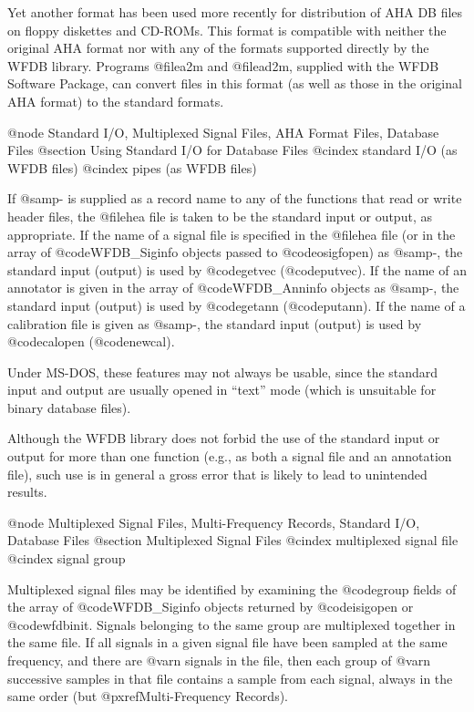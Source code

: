 {{{{{{{{{{Yet another format has been used more recently for distribution of AHA DB files
on floppy diskettes and CD-ROMs.  This format is compatible with neither the
original AHA format nor with any of the formats supported directly by the WFDB
library.  Programs @file{a2m} and @file{ad2m}, supplied with the WFDB Software
Package, can convert files in this format (as well as those in the original AHA
format) to the standard formats.

@node Standard I/O, Multiplexed Signal Files, AHA Format Files, Database Files
@section Using Standard I/O for Database Files
@cindex standard I/O (as WFDB files)
@cindex pipes (as WFDB files)

If @samp{-} is supplied as a record name to any of the functions that
read or write header files, the @file{hea} file is taken to be
the standard input or output, as appropriate.  If the name of a signal
file is specified in the @file{hea} file (or in the array of
@code{WFDB_Siginfo} objects passed to @code{osigfopen}) as @samp{-}, the
standard input (output) is used by @code{getvec} (@code{putvec}).  If
the name of an annotator is given in the array of @code{WFDB_Anninfo} objects
as @samp{-}, the standard input (output) is used by @code{getann}
(@code{putann}).  If the name of a calibration file is given as
@samp{-}, the standard input (output) is used by @code{calopen}
(@code{newcal}).

Under MS-DOS, these features may not always be usable, since the
standard input and output are usually opened in ``text'' mode (which
is unsuitable for binary database files).

Although the WFDB library does not forbid the use of the standard
input or output for more than one function (e.g., as both a signal file
and an annotation file), such use is in general a gross error that is
likely to lead to unintended results.

@node     Multiplexed Signal Files, Multi-Frequency Records, Standard I/O, Database Files
@section Multiplexed Signal Files
@cindex multiplexed signal file
@cindex signal group

Multiplexed signal files may be identified by examining the @code{group}
fields of the array of @code{WFDB_Siginfo} objects returned by
@code{isigopen} or @code{wfdbinit}.  Signals belonging to the same group
are multiplexed together in the same file.  If all signals in a given signal
file have been sampled at the same frequency, and there are @var{n} signals
in the file, then each group of @var{n} successive samples in that file
contains a sample from each signal, always in the same order
(but @pxref{Multi-Frequency Records}).

}}}}}}}}}}
